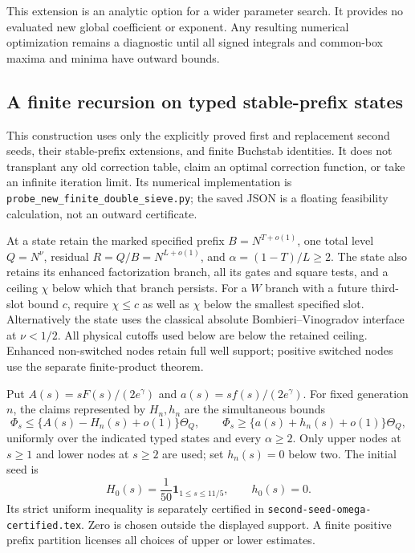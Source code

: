 \documentclass[11pt]{article}
\begin{document}
This extension is an analytic option for a wider parameter search.
It provides no evaluated new global coefficient or exponent.
Any resulting numerical optimization remains a diagnostic until
all signed integrals and common-box maxima and minima have
outward bounds.

\subsection{A finite recursion on typed stable-prefix states}
\label{sec:new-finite-double-sieve-recursion}

This construction uses only the explicitly proved first and replacement
second seeds, their stable-prefix extensions, and finite Buchstab
identities. It does not transplant any old correction table, claim an
optimal correction function, or take an infinite iteration limit.
Its numerical implementation is
\texttt{probe\_new\_finite\_double\_sieve.py}; the saved JSON is a
floating feasibility calculation, not an outward certificate.

At a state retain the marked specified prefix $B=N^{T+o(1)}$, one
total level $Q=N^\nu$, residual $R=Q/B=N^{L+o(1)}$, and
$\alpha=(1-T)/L\ge2$. The state also retains its enhanced
factorization branch, all its gates and square tests, and a ceiling
$\chi$ below which that branch persists. For a $W$ branch with a
future third-slot bound $c$, require $\chi\le c$ as well as
$\chi$ below the smallest specified slot. Alternatively the state
uses the classical absolute Bombieri--Vinogradov interface at
$\nu<1/2$. All physical cutoffs used below are below the retained
ceiling. Enhanced non-switched nodes retain full well support;
positive switched nodes use the separate finite-product theorem.

Put $A(s)=sF(s)/(2e^\gamma)$ and $a(s)=sf(s)/(2e^\gamma)$.
For fixed generation $n$, the claims represented by $H_n,h_n$ are
the simultaneous bounds
\[
 \Phi_s\le\{A(s)-H_n(s)+o(1)\}\Theta_Q,\qquad
 \Phi_s\ge\{a(s)+h_n(s)+o(1)\}\Theta_Q,
\]
uniformly over the indicated typed states and every $\alpha\ge2$.
Only upper nodes at $s\ge1$ and lower nodes at $s\ge2$ are used;
set $h_n(s)=0$ below two. The initial seed is
\[
 H_0(s)=\frac1{50}\mathbf1_{1\le s\le11/5},\qquad h_0(s)=0.
\]
Its strict uniform inequality is separately certified in
\texttt{second-seed-omega-certified.tex}. Zero is chosen outside
the displayed support. A finite positive prefix partition licenses
all choices of upper or lower estimates.
\end{document}
